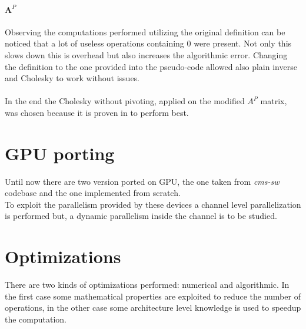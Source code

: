 \paragraph{$\boldsymbol A^P$} Observing the computations performed utilizing the original definition can be noticed that a lot of useless operations containing $0$ were present. Not only this slows down this is overhead but also increases the algorithmic error. Changing the definition to the one provided into the pseudo-code allowed also plain inverse and Cholesky to work without issues.
\paragraph*{}
In the end the Cholesky without pivoting, applied on the modified $A^P$ matrix, was chosen because it is proven in \cite{Lee_numericallyefficient} to perform best.\\

\section{GPU porting}
Until now there are two version ported on GPU, the one taken from \textit{cms-sw} codebase and the one implemented from scratch.\\
To exploit the parallelism provided by these devices a channel level parallelization is performed but, a dynamic parallelism inside the channel is to be studied.%

\section{Optimizations}
There are two kinds of optimizations performed: numerical and algorithmic. In the first case some mathematical properties are exploited to reduce the number of operations, in the other case some architecture level knowledge is used to speedup the computation.

